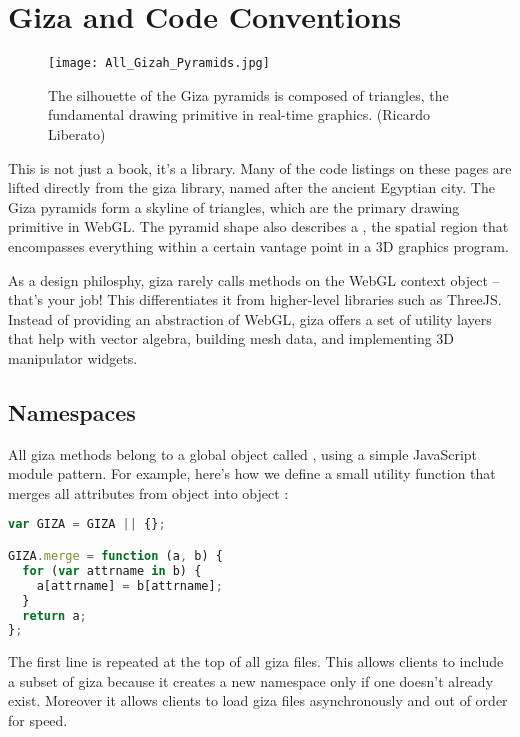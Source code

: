 
\section{Giza and Code Conventions}

\begin{figure}[htb]\centering
  \texttt{[image: All\_Gizah\_Pyramids.jpg]}
  \caption{The silhouette of the Giza pyramids is composed of triangles, the fundamental drawing primitive in real-time graphics. (Ricardo Liberato)}
  \label{fig:Giza}
\end{figure}

This is not just a book, it's a library.  Many of the code listings on these pages are lifted directly from the giza library, named after the ancient Egyptian city.  The Giza pyramids form a skyline of triangles, which are the primary drawing primitive in WebGL.  The pyramid shape also describes a , the spatial region that encompasses everything within a certain vantage point in a 3D graphics program.

As a design philosphy, giza rarely calls methods on the WebGL context object -- that's your job!  This differentiates it from higher-level libraries such as ThreeJS.  Instead of providing an abstraction of WebGL, giza offers a set of utility layers that help with vector algebra, building mesh data, and implementing 3D manipulator widgets.

\subsection{Namespaces}

All giza methods belong to a global object called , using a simple JavaScript module pattern.  For example, here's how we define a small utility function that merges all attributes from object  into object :

\begin{lstlisting}[language=JavaScript]
var GIZA = GIZA || {};

GIZA.merge = function (a, b) {
  for (var attrname in b) {
    a[attrname] = b[attrname];
  }
  return a;
};
\end{lstlisting}

The first line is repeated at the top of all giza files.  This allows clients to include a subset of giza because it creates a new  namespace only if one doesn't already exist.  Moreover it allows clients to load giza files asynchronously and out of order for speed.

